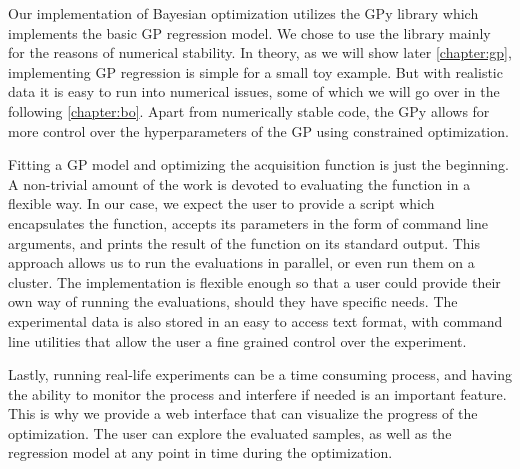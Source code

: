 Our implementation of Bayesian optimization utilizes the GPy library \citep{gpy2014}
which implements the basic GP regression model. We chose to use the library
mainly for the reasons of numerical stability. In theory, as we will show later
\autoref{chapter:gp}, implementing GP regression is simple for a small toy example.
But with realistic data it is easy to run into numerical issues, some of which
we will go over in the following \autoref{chapter:bo}. Apart from
numerically stable code, the GPy allows for more control over the
hyperparameters of the GP using constrained optimization.

Fitting a GP model and optimizing the acquisition function is just the
beginning. A non-trivial amount of the work is devoted to evaluating the
function in a flexible way. In our case, we expect the user to provide a script
which encapsulates the function, accepts its parameters in the form of command
line arguments, and prints the result of the function on its standard output.
This approach allows us to run the evaluations in parallel, or even run them on
a cluster. The implementation is flexible enough so that a user could provide
their own way of running the evaluations, should they have specific needs.  The
experimental data is also stored in an easy to access text format, with command
line utilities that allow the user a fine grained control over the experiment.

Lastly, running real-life experiments can be a time consuming process, and
having the ability to monitor the process and interfere if needed is an
important feature. This is why we provide a web interface that can visualize
the progress of the optimization. The user can explore the evaluated samples,
as well as the regression model at any point in time during the optimization.

